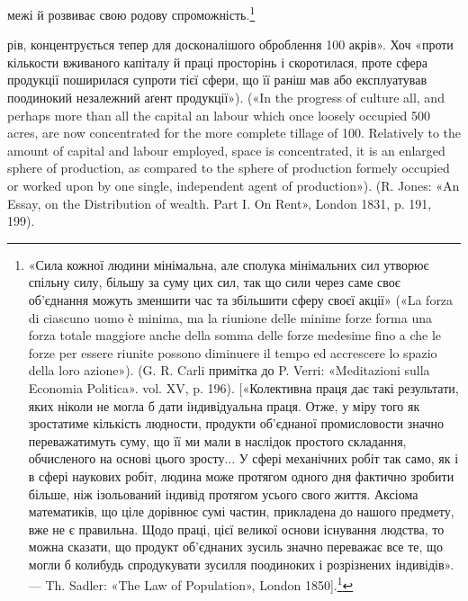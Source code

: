 межі й розвиває свою родову спроможність.\footnote{
«Сила кожної людини мінімальна, але сполука мінімальних сил
утворює спільну силу, більшу за суму цих сил, так що сили через саме
своє об’єднання можуть зменшити час та збільшити сферу своєї акції»
(«La forza di ciascuno uomo è minima, ma la riunione delle minime forze
forma una forza totale maggiore anche della somma delle forze medesime
fino a che le forze per essere riunite possono diminuere il tempo ed accrescere
lo spazio della loro azione»). (G. R. Carli примітка до P. Verri: «Meditazioni
sulla Economia Politica». vol. XV, p. 196). [«Колективна
праця дає такі результати, яких ніколи не могла б дати індивідуальна
праця. Отже, у міру того як зростатиме кількість людности, продукти
об’єднаної промисловости значно переважатимуть суму, що її ми мали
в наслідок простого складання, обчисленого на основі цього зросту...
У сфері механічних робіт так само, як і в сфері наукових робіт, людина
може протягом одного дня фактично зробити більше, ніж ізольований
індивід протягом усього свого життя. Аксіома математиків, що ціле
дорівнює сумі частин, прикладена до нашого предмету, вже не є правильна.
Щодо праці, цієї великої основи існування людства, то можна
сказати, що продукт об’єднаних зусиль значно переважає все те, що
могли б колибудь спродукувати зусилля поодиноких і розрізнених індивідів».
— Th. Sadler: «The Law of Population», London 1850].\footnote*{
Наведене тут у прямих дужках ми беремо з французького видання.
(«Le Capital etc.», v. I, ch. XIII, p. 143). Ред.
}
}

рів, концентрується тепер для досконалішого оброблення 100 акрів».
Хоч «проти кількости вживаного капіталу й праці просторінь і скоротилася,
проте сфера продукції поширилася супроти тієї сфери, що її
раніш мав або експлуатував поодинокий незалежний аґент продукції»).
(«In the progress of culture all, and perhaps more than all the capital an
labour which once loosely occupied 500 acres, are now concentrated for the
more complete tillage of 100. Relatively to the amount of capital and labour
employed, space is concentrated, it is an enlarged sphere of production,
as compared to the sphere of production formely occupied or worked upon
by one single, independent agent of production»). (R. Jones: «An Essay,
on the Distribution of wealth. Part I. On Rent», London 1831, p. 191,
199).
\parbreak{}  %
